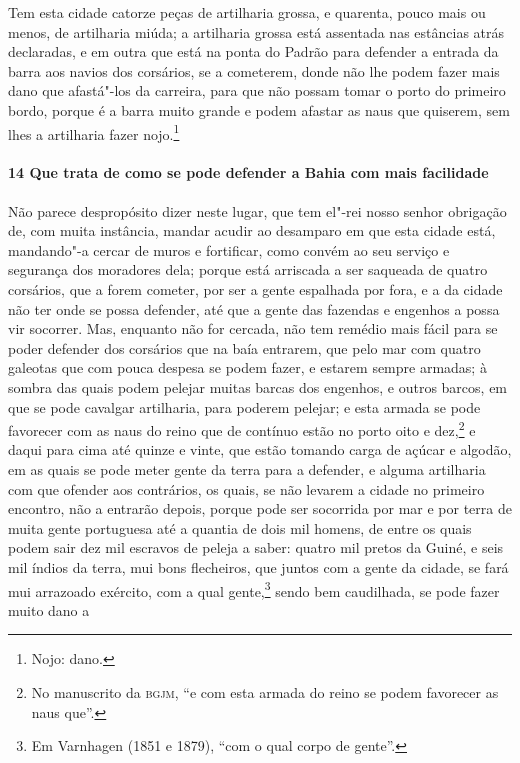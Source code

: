 Tem esta cidade catorze peças de artilharia grossa, e quarenta, pouco mais ou menos, de
artilharia miúda; a artilharia grossa está assentada nas estâncias atrás declaradas, e em
outra que está na ponta do Padrão para defender a entrada da barra aos navios dos
corsários, se a cometerem, donde não lhe podem fazer mais dano que afastá"-los da carreira,
para que não possam tomar o porto do primeiro bordo, porque é a barra muito grande e podem
afastar as naus que quiserem, sem lhes a artilharia fazer nojo.\footnote{ Nojo: dano.}


\paragraph{14 Que trata de como se pode defender a Bahia com mais facilidade}

Não parece despropósito dizer neste lugar, que tem el"-rei nosso senhor obrigação de, com
muita instância, mandar acudir ao desamparo em que esta cidade está, mandando"-a cercar de
muros e fortificar, como convém ao seu serviço e segurança dos moradores dela; porque está
arriscada a ser saqueada de quatro corsários, que a forem cometer, por ser a gente
espalhada por fora, e a da cidade não ter onde se possa defender, até que a gente das
fazendas e engenhos a possa vir socorrer. Mas, enquanto não for cercada, não tem remédio
mais fácil para se poder defender dos corsários que na baía entrarem, que pelo mar com
quatro galeotas que com pouca despesa se podem fazer, e estarem sempre armadas; à sombra
das quais podem pelejar muitas barcas dos engenhos, e outros barcos, em que se pode
cavalgar artilharia, para poderem pelejar; e esta armada se pode favorecer com as naus do
reino que de contínuo estão no porto oito e dez,\footnote{ No manuscrito da \textsc{bgjm},
``e com esta armada do reino se podem favorecer as naus que''.} e daqui para cima até
quinze e vinte, que estão tomando carga de açúcar e algodão, em as quais se pode meter
gente da terra para a defender, e alguma artilharia com que ofender aos contrários, os
quais, se não levarem a cidade no primeiro encontro, não a entrarão depois, porque pode
ser socorrida por mar e por terra de muita gente portuguesa até a quantia de dois mil
homens, de entre os quais podem sair dez mil escravos de peleja a saber: quatro mil pretos
da Guiné, e seis mil índios da terra, mui bons flecheiros, que juntos com a gente da
cidade, se fará mui arrazoado exército, com a qual gente,\footnote{ Em Varnhagen (1851 e
1879), ``com o qual corpo de gente''.} sendo bem caudilhada, se pode fazer muito dano a
